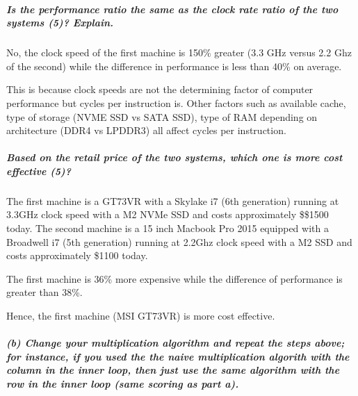 \documentclass[
]{article}
\begin{document}
\hypertarget{is-the-performance-ratio-the-same-as-the-clock-rate-ratio-of-the-two-systems-5-explain.}{%
\subparagraph{Is the performance ratio the same as the clock rate ratio
of the two systems (5)?
Explain.}\label{is-the-performance-ratio-the-same-as-the-clock-rate-ratio-of-the-two-systems-5-explain.}}

No, the clock speed of the first machine is 150\% greater (3.3 GHz
versus 2.2 Ghz of the second) while the difference in performance is
less than 40\% on average.

This is because clock speeds are not the determining factor of computer
performance but cycles per instruction is. Other factors such as
available cache, type of storage (NVME SSD vs SATA SSD), type of RAM
depending on architecture (DDR4 vs LPDDR3) all affect cycles per
instruction.

\hypertarget{based-on-the-retail-price-of-the-two-systems-which-one-is-more-cost-effective-5}{%
\subparagraph{Based on the retail price of the two systems, which one is
more cost effective
(5)?}\label{based-on-the-retail-price-of-the-two-systems-which-one-is-more-cost-effective-5}}

The first machine is a GT73VR with a Skylake i7 (6th generation) running
at 3.3GHz clock speed with a M2 NVMe SSD and costs approximately
\$\$1500 today. The second machine is a 15 inch Macbook Pro 2015
equipped with a Broadwell i7 (5th generation) running at 2.2Ghz clock
speed with a M2 SSD and costs approximately \$1100 today.

The first machine is 36\% more expensive while the difference of
performance is greater than 38\%.

Hence, the first machine (MSI GT73VR) is more cost effective.

\hypertarget{b-change-your-multiplication-algorithm-and-repeat-the-steps-above-for-instance-if-you-used-the-the-naive-multiplication-algorith-with-the-column-in-the-inner-loop-then-just-use-the-same-algorithm-with-the-row-in-the-inner-loop-same-scoring-as-part-a.}{%
\subparagraph{(b) Change your multiplication algorithm and repeat the
steps above; for instance, if you used the the naive multiplication
algorith with the column in the inner loop, then just use the same
algorithm with the row in the inner loop (same scoring as part
a).}\label{b-change-your-multiplication-algorithm-and-repeat-the-steps-above-for-instance-if-you-used-the-the-naive-multiplication-algorith-with-the-column-in-the-inner-loop-then-just-use-the-same-algorithm-with-the-row-in-the-inner-loop-same-scoring-as-part-a.}}
\end{document}
